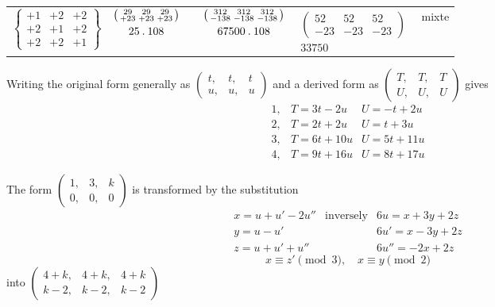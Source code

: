 \begin{center}
\begin{tabular}{ccccc l}
$\left\{\begin{smallmatrix}+1&+2&+2\\+2&+1&+2\\+2&+2&+1\end{smallmatrix}\right\}$&
$\begin{gathered}\left(\begin{smallmatrix}29&29&29\\+23&+23&+23\end{smallmatrix}\right)\\25\mathbin{.}108\end{gathered}$&&
$\begin{gathered}\left(\begin{smallmatrix}312&312&312\\-138&-138&-138\end{smallmatrix}\right)\\67500\mathbin{.}108\end{gathered}$&
$\begin{gathered}\left(\begin{smallmatrix}52&52&52\\-23&-23&-23\end{smallmatrix}\right)\\33750\end{gathered}$&mixte
\end{tabular}\end{center}

Writing the original form generally as $\left(\begin{smallmatrix}t,&t,&t\\u,&u,&u\end{smallmatrix}\right)$ and a derived form as $\left(\begin{smallmatrix}T,&T,&T\\U,&U,&U\end{smallmatrix}\right)$ gives
\[
\begin{array}{rll}
1,&T=3t-2u&U=-t+2u\\
2,&T=2t+2u&U=t+3u\\
3,&T=6t+10u&U=5t+11u\\
4,&T=9t+16u&U=8t+17u
\end{array}
\]

The form $\left(\begin{smallmatrix}1,&3,&k\\0,&0,&0\end{smallmatrix}\right)$ is transformed by the substitution
\[
\begin{array}{lll}
x=u+u'-2u''&\text{inversely}&6u=x+3y+2z\\
y=u-u'&&6u'=x-3y+2z\\
z=u+u'+u''&&6u''=-2x+2z
\end{array}
\]
\[
x\equiv z'\pmod3,\quad x\equiv y\pmod2
\]
into $\left(\begin{smallmatrix}4+k,&4+k,&4+k\\k-2,&k-2,&k-2\end{smallmatrix}\right)$

